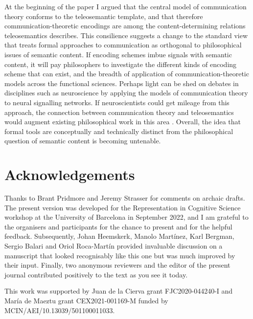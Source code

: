 \documentclass[12pt]{article}
\begin{document}
At the beginning of the paper I argued that the central model of communication theory conforms to the teleosemantic template, and that therefore communication-theoretic encodings are among the content-determining relations teleosemantics describes.
This consilience suggests a change to the standard view that treats formal approaches to communication as orthogonal to philosophical issues of semantic content.
If encoding schemes imbue signals with semantic content, it will pay philosophers to investigate the different kinds of encoding scheme that can exist, and the breadth of application of communication-theoretic models across the functional sciences.
Perhaps light can be shed on debates in disciplines such as neuroscience by applying the models of communication theory to neural signalling networks.
If neuroscientists could get mileage from this approach, the connection between communication theory and teleosemantics would augment existing philosophical work in this area \citep{cao2012teleosemantic,cao2014signaling,rathkopf2017neural,rathkopf2017what}.
Overall, the idea that formal tools are conceptually and technically distinct from the philosophical question of semantic content is becoming untenable.

\section*{Acknowledgements}

Thanks to Brant Pridmore and Jeremy Strasser for comments on archaic drafts. The present version was developed for the Representation in Cognitive Science workshop at the University of Barcelona in September 2022, and I am grateful to the organisers and participants for the chance to present and for the helpful feedback. Subsequently, Johan Heemskerk, Manolo Martínez, Karl Bergman, Sergio Balari and Oriol Roca-Martín provided invaluable discussion on a manuscript that looked recognisably like this one but was much improved by their input. Finally, two anonymous reviewers and the editor of the present journal contributed positively to the text as you see it today.

This work was supported by Juan de la Cierva grant FJC2020-044240-I and María de Maeztu grant CEX2021-001169-M funded by MCIN/AEI/10.13039/501100011033.

\printbibliography
\end{document}
